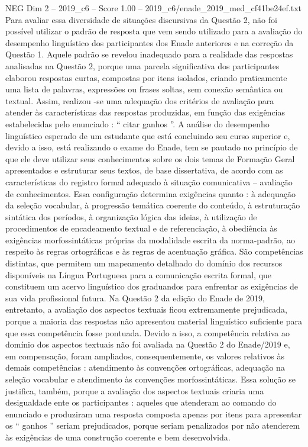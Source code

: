 \begin{textsample}{NEG Dim 2 – 2019\_c6 – Score 1.00 – 2019\_c6/enade\_2019\_med\_cf41be24ef.txt}
Para avaliar essa diversidade de situações discursivas da Questão 2, não foi possível utilizar o padrão de resposta que vem sendo utilizado para a avaliação do desempenho linguístico dos participantes dos Enade anteriores e na correção da Questão 1.
Aquele padrão se revelou inadequado para a realidade das respostas analisadas na Questão 2, porque uma parcela significativa dos participantes elaborou respostas curtas, compostas por itens isolados, criando praticamente uma lista de palavras, expressões ou frases soltas, sem conexão semântica ou textual.
Assim, realizou -se uma adequação dos critérios de avaliação para atender às características das respostas produzidas, em função das exigências estabelecidas pelo enunciado : “ citar ganhos ”.
A análise do desempenho linguístico esperado de um estudante que está concluindo seu curso superior e, devido a isso, está realizando o exame do Enade, tem se pautado no princípio de que ele deve utilizar seus conhecimentos sobre os dois temas de Formação Geral apresentados e estruturar seus textos, de base dissertativa, de acordo com as características do registro formal adequado à situação comunicativa – avaliação de conhecimentos.
Essa configuração determina exigências quanto : à adequação da seleção vocabular, à progressão temática coerente do conteúdo, à estruturação sintática dos períodos, à organização lógica das ideias, à utilização de procedimentos de encadeamento textual e de referenciação, à obediência às exigências morfossintáticas próprias da modalidade escrita da norma-padrão, ao respeito às regras ortográficas e às regras de acentuação gráfica.
São competências distintas, que permitem um mapeamento detalhado do domínio dos recursos disponíveis na Língua Portuguesa para a comunicação escrita formal, que constituem um acervo linguístico dos graduandos para enfrentar as exigências de sua vida profissional futura.
Na Questão 2 da edição do Enade de 2019, entretanto, a avaliação dos aspectos textuais ficou extremamente prejudicada, porque a maioria das respostas não apresentou material linguístico suficiente para que essa competência fosse pontuada.
Devido a isso, a competência relativa ao domínio dos aspectos textuais não foi avaliada na Questão 2 do Enade/2019 e, em compensação, foram ampliados, consequentemente, os valores relativos às demais competências : atendimento às convenções ortográficas, adequação na seleção vocabular e atendimento às convenções morfossintáticas.
Essa solução se justifica, também, porque a avaliação dos aspectos textuais criaria uma desigualdade ente os participantes : aqueles que atenderam ao comando do enunciado e produziram uma resposta composta apenas por itens para apresentar os “ ganhos ” seriam prejudicados, porque seriam penalizados por não atenderem às exigências de uma construção coerente e bem desenvolvida.

\end{textsample}
